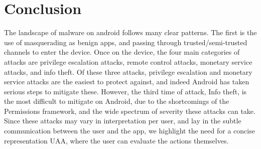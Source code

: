 \section{Conclusion}
The landscape of malware on android follows many clear patterns. The first is the use of masquerading as benign apps, and passing through trusted/semi-trusted channels to enter the device. Once on the device, the four main categories of attacks are privilege escalation attacks, remote control attacks, monetary service attacks, and info theft. Of these three attacks, privilege escalation and monetary service attacks are the easiest to protect against, and indeed Android has taken serious steps to mitigate these. However, the third time of attack, Info theft, is the most difficult to mitigate on Android, due to the shortcomings of the Permissions framework, and the wide spectrum of severity these attacks can take. Since these attacks may vary in interpretation per user, and lay in the subtle communication between the user and the app, we highlight the need for a concise representation UAA, where the user can evaluate the actions themselves.

